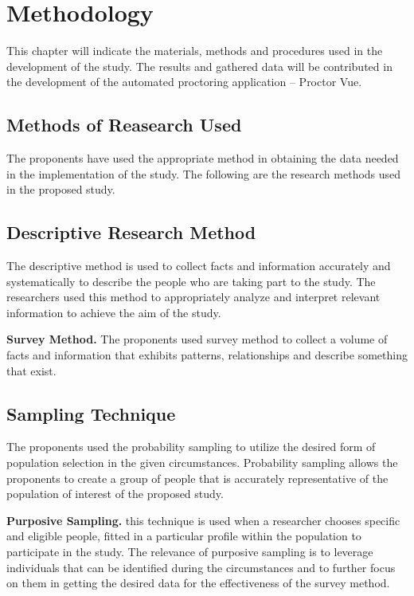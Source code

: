 \chapter{Methodology}

This chapter will indicate the materials, methods and procedures used in the development of the study.
The results and gathered data will be contributed in the development of the automated proctoring application – Proctor Vue.

\section{Methods of Reasearch Used}

The proponents have used the appropriate method in obtaining the data needed in the implementation of the study.
The following are the research methods used in the proposed study.

\section{Descriptive Research Method}

The descriptive method is used to collect facts and information accurately and systematically to describe the people who are taking part to the study.
The researchers used this method to appropriately analyze and interpret relevant information to achieve the aim of the study.

\textbf{Survey Method.}
The proponents used survey method to collect a volume of facts and information that exhibits patterns, relationships and describe something that exist.

\section{Sampling Technique}

The proponents used the probability sampling to utilize the desired form of population selection in the given circumstances.
Probability sampling allows the proponents to create a group of people that is accurately representative of the population of interest of the proposed study.

\textbf{Purposive Sampling.}
this technique is used when a researcher chooses specific and eligible people, fitted in a particular profile within the population to participate in the study.
The relevance of purposive sampling is to leverage individuals that can be identified during the circumstances and to further focus on them in getting the desired data for the effectiveness of the survey method.

